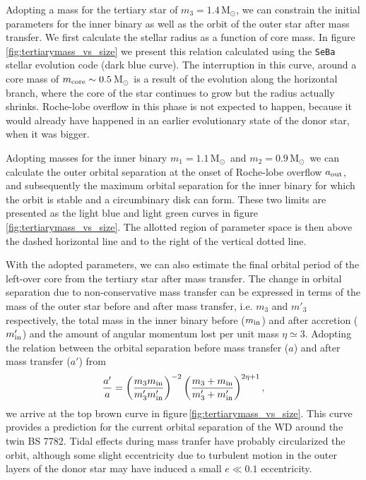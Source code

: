 \documentclass{aastex62}
\newcommand{\MSun}{\mbox{M$_\odot$}}
\begin{document}
Adopting a mass for the tertiary star of $m_3 = 1.4$\,\MSun, we
can constrain the initial parameters for the inner binary as well as
the orbit of the outer star after mass transfer. We first calculate
the stellar radius as a function of core mass. In
figure\,\ref{fig:tertiarymass_vs_size} we present this relation
calculated using the {\tt SeBa} stellar evolution code
\cite{1996A&A...309..179P} (dark blue curve).  The interruption in
this curve, around a core mass of $m_{\rm core} \sim 0.5$\,\MSun\, is
a result of the evolution along the horizontal branch, where the core
of the star continues to grow but the radius actually shrinks.
Roche-lobe overflow in this phase is not expected to happen, because
it would already have happened in an earlier evolutionary state of the
donor star, when it was bigger.

Adopting masses for the inner binary $m_1=1.1$\,\MSun\, and
$m_2=0.9$\,\MSun\, we can calculate the outer orbital separation at
the onset of Roche-lobe overflow $a_{\rm out}$, and subsequently the
maximum orbital separation for the inner binary for which the orbit is
stable and a circumbinary disk can form. These two limits are
presented as the light blue and light green curves in
figure\,\ref{fig:tertiarymass_vs_size}.  The allotted region of
parameter space is then above the dashed horizontal line and to the
right of the vertical dotted line.

With the adopted parameters, we can also estimate the final orbital
period of the left-over core from the tertiary star after 
mass transfer.  The change in orbital separation due to
non-conservative mass transfer can be expressed in terms of the mass
of the outer star before and after mass transfer, i.e. $m_3$ and $m'_3$
respectively, the total mass in the inner binary before ($m_{\rm in}$)
and after accretion ($m'_{\rm in}$) and the amount of angular momentum
lost per unit mass $\eta \simeq 3$. Adopting the relation between the
orbital separation before mass transfer ($a$) and after mass transfer
($a'$) from \cite{1995A&A...296..691P}
\begin{equation}
  {a' \over a} = \left( {m_3 m_{\rm in} \over m'_3 m'_{\rm in}} \right)^{-2}
  \left( {m_3 + m_{\rm in} \over m'_3 + m'_{\rm in}} \right)^{2\eta + 1},
\end{equation}
we arrive at the top brown curve in
figure\,\ref{fig:tertiarymass_vs_size}. This curve provides a prediction for 
the current orbital separation of the WD around the twin
BS 7782. Tidal effects during mass tranfer
have probably circularized the orbit, although some slight eccentricity
due to turbulent motion in the outer layers of the donor star may have
induced a small $e \ll 0.1$ eccentricity.
\end{document}
